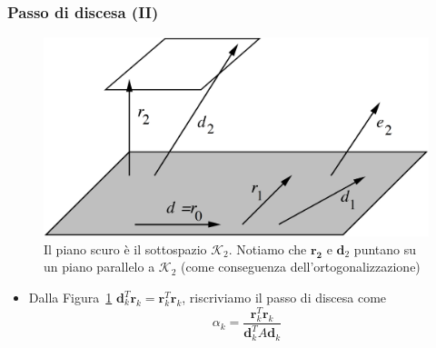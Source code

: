 \documentclass[10pt]{beamer}
\begin{document}
    
    
    

\begin{frame} \frametitle{Passo di discesa (II)}
\begin{figure}
    \centering
    \includegraphics[width=.75\linewidth]{cg_ort.png}
    \caption{Il piano scuro è il sottospazio $\mathcal{K}_2$. Notiamo che $\mathbf{r_2}$ e $\mathbf{d}_2$ puntano su un piano parallelo a $\mathcal{K}_2$ (come conseguenza dell'ortogonalizzazione)}
    \label{fig:ortogonalizzazione}
\end{figure}
\begin{itemize}
\item Dalla Figura~\ref{fig:ortogonalizzazione} $\mathbf{d}_k^T\mathbf{r}_k=\mathbf{r}_k^T\mathbf{r}_k$, riscriviamo il passo di discesa come
$$
\alpha_k=\frac{\mathbf{r}_k^T \mathbf{r}_k}{\mathbf{d}_k^T A \mathbf{d}_k}
$$

\end{itemize}
\end{frame}
\end{document}
